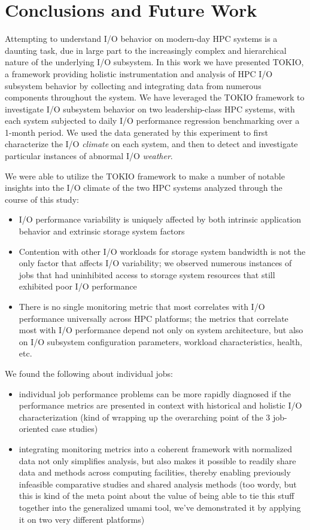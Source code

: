 \section{Conclusions and Future Work} \label{sec:conclusions}

Attempting to understand I/O behavior on modern-day HPC systems is a daunting task, due in large part to the increasingly complex and hierarchical nature of the underlying I/O subsystem.
In this work we have presented TOKIO, a framework providing holistic instrumentation and analysis of HPC I/O subsystem behavior by collecting and integrating data from numerous components throughout the system.
We have leveraged the TOKIO framework to investigate I/O subsystem behavior on two leadership-class HPC systems, with each system subjected to daily I/O performance regression benchmarking over a 1-month period.
We used the data generated by this experiment to first characterize the I/O \emph{climate} on each system, and then to detect and investigate particular instances of abnormal I/O \emph{weather}.

We were able to utilize the TOKIO framework to make a number of notable insights into the I/O climate of the two HPC systems analyzed through the course of this study:

\begin{itemize}
\item I/O performance variability is uniquely affected by both intrinsic application behavior and extrinsic storage system factors
\item Contention with other I/O workloads for storage system bandwidth is not the only factor that affects I/O variability; we observed numerous instances of jobs that had uninhibited access to storage system resources that still exhibited poor I/O performance
\item There is no single monitoring metric that most correlates with I/O performance universally across HPC platforms; the metrics that correlate most with I/O performance depend not only on system architecture, but also on I/O subsystem configuration parameters, workload characteristics, health, etc.
\end{itemize}

We found the following about individual jobs:

\begin{itemize}
\item individual job performance problems can be more rapidly diagnosed if the performance metrics are presented in context with historical and holistic I/O characterization (kind of wrapping up the overarching point of the 3 job-oriented case studies)
\item integrating monitoring metrics into a coherent framework with normalized data not only simplifies analysis, but also makes it possible to readily share data and methods across computing facilities, thereby enabling previously infeasible comparative studies and shared analysis methods (too wordy, but this is kind of the meta point about the value of being able to tie this  stuff together into the generalized umami tool, we've demonstrated it by applying it on two very different platforms)
\end{itemize}

